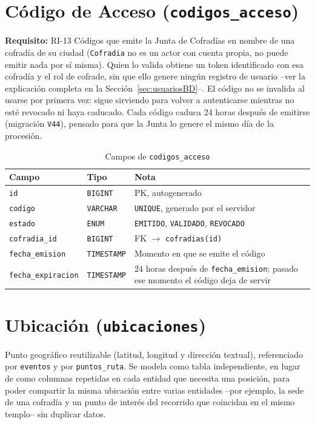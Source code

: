\section{Código de Acceso (\texttt{codigos\_acceso})}
\textbf{Requisito:} RI-13
Códigos que emite la Junta de Cofradías en nombre de una cofradía de su ciudad (\texttt{Cofradia} no es un actor con cuenta propia, no puede emitir nada por sí misma). Quien lo valida obtiene un token identificado con esa cofradía y el rol de cofrade, sin que ello genere ningún registro de usuario --ver la explicación completa en la Sección~\ref{sec:usuariosBD}--. El código no se invalida al usarse por primera vez: sigue sirviendo para volver a autenticarse mientras no esté revocado ni haya caducado. Cada código caduca 24 horas después de emitirse (migración \texttt{V44}), pensado para que la Junta lo genere el mismo día de la procesión.

\begin{table}[H]
\centering
\begin{tabular}{|l|l|p{7cm}|}
\hline
\textbf{Campo} & \textbf{Tipo} & \textbf{Nota} \\
\hline
\texttt{id} & \texttt{BIGINT} & PK, autogenerado \\
\hline
\texttt{codigo} & \texttt{VARCHAR} & \texttt{UNIQUE}, generado por el servidor \\
\hline
\texttt{estado} & \texttt{ENUM} & \texttt{EMITIDO}, \texttt{VALIDADO}, \texttt{REVOCADO} \\
\hline
\texttt{cofradia\_id} & \texttt{BIGINT} & FK $\to$ \texttt{cofradias(id)} \\
\hline
\texttt{fecha\_emision} & \texttt{TIMESTAMP} & Momento en que se emite el código \\
\hline
\texttt{fecha\_expiracion} & \texttt{TIMESTAMP} & 24 horas después de \texttt{fecha\_emision}; pasado ese momento el código deja de servir \\
\hline
\end{tabular}
\caption{Campos de \texttt{codigos\_acceso}}
\end{table}

\section{Ubicación (\texttt{ubicaciones})}
Punto geográfico reutilizable (latitud, longitud y dirección textual), referenciado por \texttt{eventos} y por \texttt{puntos\_ruta}. Se modela como tabla independiente, en lugar de como columnas repetidas en cada entidad que necesita una posición, para poder compartir la misma ubicación entre varias entidades --por ejemplo, la sede de una cofradía y un punto de interés del recorrido que coincidan en el mismo templo-- sin duplicar datos.

